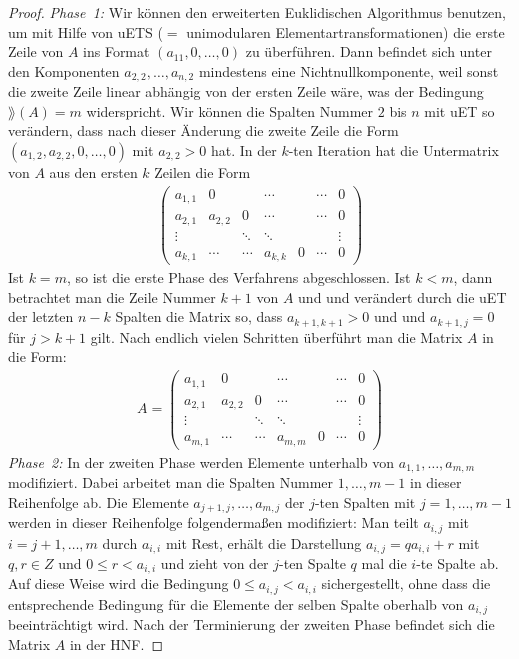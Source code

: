 	\begin{proof}
		\emph{Phase~1:} Wir können den erweiterten Euklidischen Algorithmus benutzen, um mit Hilfe von uETS ($=$ unimodularen Elementartransformationen) die erste Zeile von $A$ ins Format $(a_{11}, 0,\ldots, 0)$ zu überführen. 
		Dann befindet sich unter den Komponenten $a_{2,2},\ldots,a_{n,2}$ mindestens eine Nichtnullkomponente, weil sonst die zweite Zeile linear abhängig von der ersten Zeile wäre, was der Bedingung $\rang(A) = m$ widerspricht. Wir können die Spalten Nummer $2$ bis $n$ mit uET so verändern, dass nach dieser Änderung die zweite Zeile die Form $(a_{1,2},a_{2,2},0,\ldots,0)$ mit $a_{2,2}  >0$ hat. In der $k$-ten Iteration hat die Untermatrix von  $A$ aus den ersten $k$  Zeilen die Form 
		\begin{align*}
			\begin{pmatrix*}
				a_{1,1} & 0 &   & \cdots & & \cdots & 0 
				\\					a_{2,1} & a_{2,2} & 0 & \cdots & & \cdots & 0 
				\\ \vdots  & & \ddots & \ddots &  & & \vdots 
				\\ a_{k,1} & \cdots & \cdots & a_{k,k} &  0 & \cdots & 0 
			\end{pmatrix*} 
		\end{align*} 
		Ist $k=m$, so ist die erste Phase des Verfahrens abgeschlossen. Ist $k<m$, dann betrachtet man die Zeile Nummer $k+1$ von $A$ und und verändert durch die uET der letzten $n-k$ Spalten die Matrix so, dass $a_{k+1,k+1}>0$ und und $a_{k+1,j} =0$ für $j> k+1$ gilt. Nach endlich vielen Schritten überführt man die Matrix $A$ in die Form: 
		\begin{align*}
			A=
			\begin{pmatrix*}
				a_{1,1} & 0 &   & \cdots & & \cdots & 0 
				\\					a_{2,1} & a_{2,2} & 0 & \cdots & & \cdots & 0 
				\\ \vdots  & & \ddots & \ddots &  & & \vdots 
				\\ a_{m,1} & \cdots & \cdots & a_{m,m} &  0 & \cdots & 0 
			\end{pmatrix*} 
		\end{align*} 
		\emph{Phase~2:} In der zweiten Phase werden Elemente unterhalb von $a_{1,1},\ldots, a_{m,m}$ modifiziert. Dabei  arbeitet man die Spalten Nummer $1,\ldots,m-1$ in dieser Reihenfolge ab. Die Elemente $a_{j+1,j},\ldots, a_{m,j}$ der $j$-ten Spalten mit $j=1,\ldots, m-1$ werden in dieser Reihenfolge folgendermaßen modifiziert: Man teilt $a_{i,j}$ mit $i=j+1,\ldots,m$ durch $a_{i,i}$ mit Rest, erhält die Darstellung $a_{i,j} = q a_{i,i} + r$ mit $q,r \in Z$ und $0 \le r < a_{i,i}$ und zieht von der $j$-ten Spalte $q$ mal die $i$-te Spalte ab. Auf diese Weise wird die Bedingung $0 \le a_{i,j} < a_{i,i}$ sichergestellt, ohne dass die entsprechende Bedingung für die Elemente der selben Spalte oberhalb von $a_{i,j}$ beeinträchtigt wird. Nach der Terminierung der zweiten Phase befindet sich die Matrix $A$ in der HNF. 
		

\end{proof}
